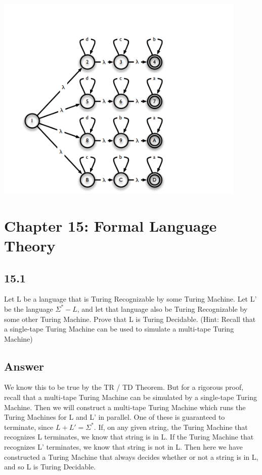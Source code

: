 \documentclass{article}
\begin{document}
\begin{center}
    \includegraphics[width=12cm]{12.png}
\end{center}

\newpage
\section*{Chapter 15: Formal Language Theory}
\subsection*{15.1}
Let L be a language that is Turing Recognizable by some Turing Machine. Let L' be the language $\Sigma^* - L$,
and let that language also be Turing Recognizable by some other Turing Machine. Prove that L is Turing Decidable.
(Hint: Recall that a single-tape Turing Machine can be used to simulate a multi-tape Turing Machine)
\subsection*{Answer}
We know this to be true by the TR / TD Theorem. But for a rigorous proof, recall that a multi-tape Turing Machine can be simulated by
a single-tape Turing Machine. Then we will construct a multi-tape Turing Machine which runs the Turing Machines for L and L' in parallel. One of these
is guaranteed to terminate, since $L + L' = \Sigma^*$. If, on any given string, the Turing Machine that recognizes L terminates, 
we know that string is in L. If the Turing Machine that recognizes L' terminates, we know that string is not in L. Then here we have
constructed a Turing Machine that always decides whether or not a string is in L, and so L is Turing Decidable.
\end{document}
